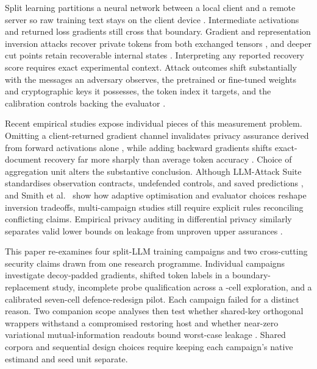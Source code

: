 \documentclass[11pt]{article}
\begin{document}
Split learning partitions a neural network between a local client and a
remote server so raw training text stays on the client device
\cite{vepakomma2018,splitsurvey2026}. Intermediate activations and returned
loss gradients still cross that boundary. Gradient and representation
inversion attacks recover private tokens from both exchanged tensors
\cite{gisurvey2022,dager2024,fedspy2026}, and deeper cut points retain
recoverable internal states \cite{depth2025,actinv2026,bettisplit2026}.
Interpreting any reported recovery score requires exact experimental
context. Attack outcomes shift substantially with the messages an adversary
observes, the pretrained or fine-tuned weights and cryptographic keys it
possesses, the token index it targets, and the calibration controls backing
the evaluator \cite{ablation2026,adaptive2022,labelbudget2026}.

Recent empirical studies expose individual pieces of this measurement
problem. Omitting a client-returned gradient channel invalidates privacy
assurance derived from forward activations alone \cite{paper1}, while adding
backward gradients shifts exact-document recovery far more sharply than
average token accuracy \cite{gradients2026}. Choice of aggregation unit
alters the substantive conclusion. Although LLM-Attack Suite standardises
observation contracts, undefended controls, and saved predictions
\cite{suite2026}, and Smith et al.\ \cite{mia2026} show how adaptive
optimisation and evaluator choices reshape inversion tradeoffs,
multi-campaign studies still require explicit rules reconciling conflicting
claims. Empirical privacy auditing in differential privacy similarly
separates valid lower bounds on leakage from unproven upper assurances
\cite{jagielski2020}.

This paper re-examines four split-LLM training campaigns and two
cross-cutting security claims drawn from one research programme. Individual
campaigns investigate decoy-padded gradients, shifted token labels in a
boundary-replacement study, incomplete probe qualification across a
\RoneCells-cell exploration, and a calibrated seven-cell defence-redesign
pilot. Each campaign failed for a distinct reason. Two companion scope
analyses then test whether shared-key orthogonal wrappers withstand a
compromised restoring host \cite{permattack2025} and whether near-zero
variational mutual-information readouts bound worst-case leakage
\cite{belghazi2018,mcallester2020,song2020}. Shared corpora and sequential
design choices require keeping each campaign's native estimand and seed
unit separate.
\end{document}
